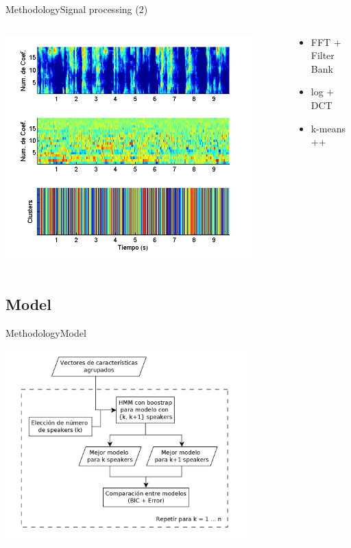 \documentclass[10pt]{beamer}
\begin{document}
\begin{frame}{Methodology}{Signal processing (2)}
\small {
\vspace{0mm} 
\begin{columns}   
  \begin{column}{0.6\textwidth} 
    \hfill  
    \includegraphics[width=0.9\textwidth]{gfx/filename52}    
  \end{column}
  \begin{column}{0.4\textwidth}
    \vspace{-8mm} 
    \begin{itemize}
      \setlength{\itemindent}{-2em}      
      \itemsep 4.6em    
      \item FFT + Filter Bank
      \item log + DCT
      \item k-means ++
    \end{itemize}
  \end{column}   
\end{columns}   
}
\end{frame}

\subsection{Model}
\begin{frame}{Methodology}{Model}
  \begin{center}
    \includegraphics[width=0.7\textwidth]{gfx/dia-hmm}
  \end{center}
\end{frame}
\end{document}
